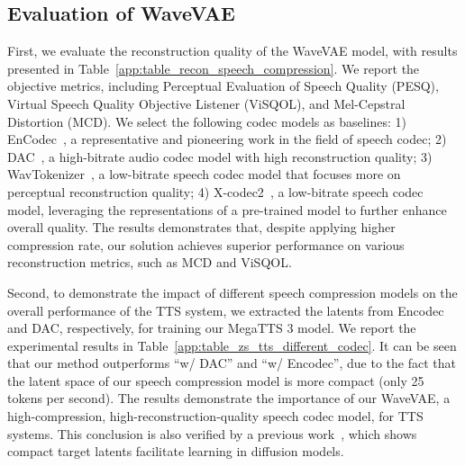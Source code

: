 \subsection{Evaluation of WaveVAE}
\label{app:evaluation_speech_compression}
First, we evaluate the reconstruction quality of the WaveVAE model, with results presented in Table~\ref{app:table_recon_speech_compression}. We report the objective metrics, including Perceptual Evaluation of Speech Quality (PESQ), Virtual Speech Quality Objective Listener (ViSQOL), and Mel-Cepstral Distortion (MCD). We select the following codec models as baselines: 1) EnCodec~\citep{defossez2022high}, a representative and pioneering work in the field of speech codec; 2) DAC~\citep{kumar2024high}, a high-bitrate audio codec model with high reconstruction quality; 3) WavTokenizer~\citep{ji2024wavtokenizer}, a low-bitrate speech codec model that focuses more on perceptual reconstruction quality; 4) X-codec2~\citep{ye2025llasa}, a low-bitrate speech codec model, leveraging the representations of a pre-trained model to further enhance overall quality. The results demonstrates that, despite applying higher compression rate, our solution achieves superior performance on various reconstruction metrics, such as MCD and ViSQOL. 

Second, to demonstrate the impact of different speech compression models on the overall performance of the TTS system, we extracted the latents from Encodec and DAC, respectively, for training our MegaTTS 3 model. We report the experimental results in Table~\ref{app:table_zs_tts_different_codec}. It can be seen that our method outperforms ``w/ DAC'' and ``w/ Encodec'', due to the fact that the latent space of our speech compression model is more compact (only 25 tokens per second). The results demonstrate the importance of our WaveVAE, a high-compression, high-reconstruction-quality speech codec model, for TTS systems. This conclusion is also verified by a previous work~\citep{lee2024ditto}, which shows compact target latents facilitate learning in diffusion models.


